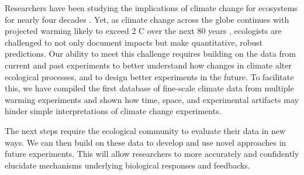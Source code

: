 \documentclass{article}
\begin{document}
 \par Researchers have been studying the implications of climate change for ecosystems for nearly four decades \citep[e.g.,][]{tamaki1981,carlson1982}.
Yet, as climate change across the globe continues with projected warming likely to exceed 2 \degree C over the next 80 years \citep{ipcc2013}, ecologists are challenged to not only document impacts but make quantitative, robust predictions. Our ability to meet this challenge requires building on the data from current and past experiments to better understand how changes in climate alter ecological processes, and to design better experiments in the future. To facilitate this, we have compiled the first database of fine-scale climate data from multiple warming experiments and shown how time, space, and experimental artifacts may hinder simple interpretations of climate change experiments. 

\par The next steps require the ecological community to evaluate their data in new ways. We can then build on these data to develop and use novel approaches in future experiments. This will allow researchers to more accurately and confidently elucidate mechanisms underlying biological responses and feedbacks.
\end{document}
